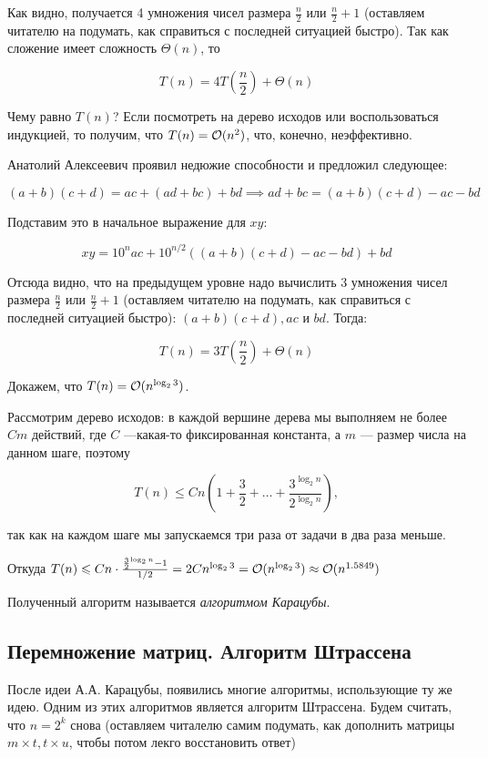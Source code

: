 Как видно, получается 4 умножения чисел размера $\frac{n}{2}$ или $\frac{n}{2} + 1$ (оставляем читателю
на подумать, как справиться с последней ситуацией быстро). Так как сложение имеет сложность $\Theta(n)$, то

\[T(n) = 4T\left( \frac{n}{2} \right) + \Theta(n)\]

Чему равно $T(n)$? Если посмотреть на дерево исходов или воспользоваться 
индукцией, то получим, что $T(n) = \mathcal{O}(n^2)$, что, конечно,
неэффективно.

Анатолий Алексеевич проявил недюжие способности и предложил
следующее:

\[(a+b)(c+d) = ac+(ad+bc) + bd \implies ad + bc = (a + b)(c + d) - ac - bd\]

Подставим это в начальное выражение для $xy$:

\[xy = 10^{n}ac + 10^{n/2}((a + b)(c + d) - ac - bd)+bd\]

Отсюда видно, что на предыдущем уровне надо вычислить 3 умножения
чисел размера $\frac{n}{2}$ или $\frac{n}{2} + 1$ (оставляем читателю
на подумать, как справиться с последней ситуацией быстро): $(a + b)(c + d), ac$ и $bd$. Тогда:

\[T(n) = 3T\left( \frac{n}{2} \right) + \Theta(n)\]

Докажем, что $T(n) = \mathcal{O}(n^{\log_2 3})$.

Рассмотрим дерево исходов: в каждой вершине дерева мы выполняем не более
$Cm$ действий, где $C$ ---какая-то фиксированная константа, а $m$ --- размер числа на данном шаге, поэтому 

\[
  T(n) \leqslant Cn\left(1 + \frac{3}{2} + \ldots + \frac{3^{\log_2 n}}{2^{
  \log_2 n}}\right),
\]

так как на каждом шаге мы запускаемся три раза от задачи в два раза меньше.

Откуда $T(n) \leqslant Cn \cdot \frac{\frac{3}{2}^{\log_2 n} - 1}{1/2} = 
2Cn^{\log_2 3} = \mathcal{O}(n^{\log_2 3}) \approx \mathcal{O}(n^{1.5849})$

Полученный алгоритм называется \emph{алгоритмом Карацубы}.

\subsection{Перемножение матриц. Алгоритм Штрассена}

После идеи А.А. Карацубы, появились многие алгоритмы, использующие ту же идею.
Одним из этих алгоритмов является алгоритм Штрассена. Будем считать, что $n = 
2^k$ снова (оставляем читалелю самим подумать, как дополнить матрицы $m \times t,
t \times u$, чтобы потом лекго восстановить ответ)

